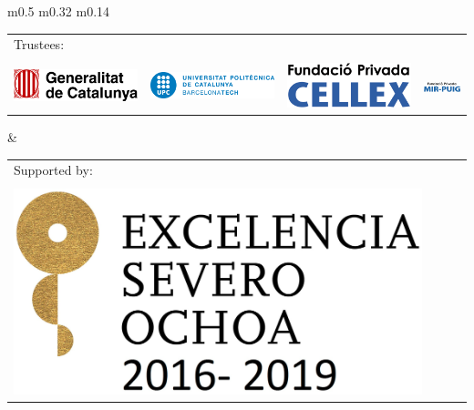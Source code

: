 \documentclass[a0paper,portrait]{baposter}
\begin{document}
\begin{poster}
{\begin{center}
\begin{tabular}{m{} m{} m{}}
\begin{tabular}{llll}
\multicolumn{4}{l}{\color{icfoblue} \small Trustees: }
\\ \arrayrulecolor{icfoblue}\hline
&&& \\[-2mm]
\includegraphics[height=\logoheight]{Logos/GeneralitatDeCatalunya.png} & \hspace{2mm}
\includegraphics[height=\logoheight]{Logos/UPC.png} & \hspace{2mm}
\includegraphics[height=\logoheight]{Logos/Fundacio-CELLEX.png} & \hspace{2mm}
\includegraphics[height=\logoheight]{Logos/Fundacio-Mir-Puig.png} 
\end{tabular}
&
\begin{tabular}{llll}
\multicolumn{4}{l}{\color{icfoblue} \small Supported by: }
\\ \arrayrulecolor{icfoblue}\hline
&&& \\[-2mm]
\includegraphics[height=\logoheight]{Logos/Severo-Ochoa.png} & \hspace{2mm}

\end{tabular}
\end{tabular}
\end{center}}
\end{poster}
\end{document}
